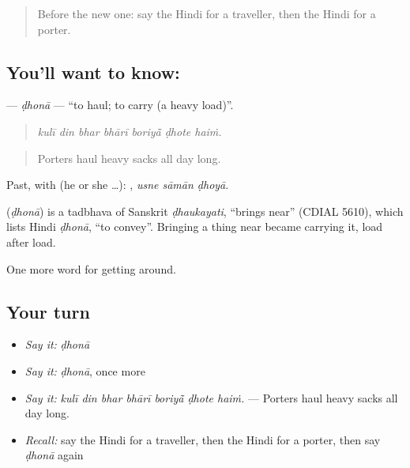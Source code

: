\label{lesson:HI-C398-dhhona}



\begin{quote}
Before the new one: say the Hindi for a traveller, then the Hindi for a porter.
\end{quote}

\subsection*{You'll want to know: }
\textbf{} — \emph{ḍhonā} — \textquotedblleft{}to haul; to carry (a heavy load)\textquotedblright{}.

\begin{quote}
      
\end{quote}

\begin{quote}
\emph{kulī din bhar bhārī boriyā̃ ḍhote haiṁ.}
\end{quote}

\begin{quote}
Porters haul heavy sacks all day long.
\end{quote}

Past, with  (he or she …):   , \emph{usne sāmān ḍhoyā}.

\begin{cousinweb}
\textbf{} (\emph{ḍhonā}) is a tadbhava of Sanskrit \emph{ḍhaukayati}, \textquotedblleft{}brings near\textquotedblright{} (CDIAL 5610), which lists Hindi \emph{ḍhonā}, \textquotedblleft{}to convey\textquotedblright{}. Bringing a thing near became carrying it, load after load.
\end{cousinweb}

\begin{grammarlens}[title={What you've built}]
One more word for getting around.
\end{grammarlens}

\subsection*{Your turn}
\begin{itemize}
\raggedright
  \item \emph{Say it:} \emph{ḍhonā}
  \item \emph{Say it:} \emph{ḍhonā}, once more
  \item \emph{Say it:} \emph{kulī din bhar bhārī boriyā̃ ḍhote haiṁ.} — Porters haul heavy sacks all day long.
  \item \emph{Recall:} say the Hindi for a traveller, then the Hindi for a porter, then say \emph{ḍhonā} again
\end{itemize}

